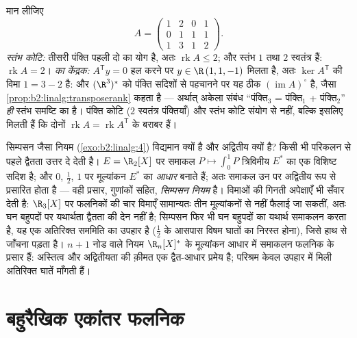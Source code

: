 \begin{example}[कोटि दोनों ओर से पढ़ी गई]\label{ex:b2:linalg:rankbothsides}
मान लीजिए
\[
A = \begin{pmatrix}
1 & 2 & 0 & 1\\
0 & 1 & 1 & 1\\
1 & 3 & 1 & 2
\end{pmatrix} .
\]
\emph{स्तंभ कोटि:} तीसरी पंक्ति पहली दो का योग है, अतः $\operatorname{rk} A \leq 2$; और स्तंभ
$1$ तथा $2$ स्वतंत्र हैं: $\operatorname{rk} A = 2$। \emph{ का केंद्रक:} $A^{\mathsf T}y = 0$ हल करने
पर $y \in \R\,(1, 1, -1)$ मिलता है, अतः $\ker
A^{\mathsf T}$ की विमा $1 = 3 - 2$ है: और $(\R^3)^*$ को पंक्ति सदिशों से
पहचानने पर यह ठीक $(\operatorname{im} A)^\circ$ है, जैसा \cref{prop:b2:linalg:transposerank} कहता है --- अर्थात् अकेला संबंध
``पंक्ति$_3$ = पंक्ति$_1$ + पंक्ति$_2$'' \emph{ही} स्तंभ समष्टि का
 है। पंक्ति कोटि ($2$ स्वतंत्र पंक्तियाँ) और स्तंभ कोटि संयोग
से नहीं, बल्कि इसलिए मिलती हैं कि दोनों $\operatorname{rk} A = \operatorname{rk} A^{\mathsf T}$ के बराबर हैं।
\end{example}

\begin{example}[द्वैतता एक समाकलन नियम पढ़ती है]\label{ex:b2:linalg:quadratureread}
सिम्पसन जैसा नियम (\cref{exo:b2:linalg:4}) विद्यमान क्यों है और अद्वितीय क्यों है? किसी
भी परिकलन से पहले द्वैतता उत्तर दे देती है। $E = \R_2[X]$ पर समाकल $P \mapsto \int_0^1 P$
त्रिविमीय  $E^*$ का एक विशिष्ट सदिश है; और $0$, $\frac12$, $1$ पर
मूल्यांकन $E^*$ का \emph{आधार} बनाते हैं; अतः समाकल उन पर अद्वितीय रूप
से प्रसारित होता है --- वही प्रसार, गुणांकों सहित, \emph{सिम्पसन नियम}
है। विमाओं की गिनती अपेक्षाएँ भी सँवार देती है: $\R_3[X]$ पर फलनिकों की चार
विमाएँ सामान्यतः तीन मूल्यांकनों से नहीं फैलाई जा सकतीं, अतः घन
बहुपदों पर यथार्थता द्वैतता की देन नहीं है; सिम्पसन फिर भी घन बहुपदों
का यथार्थ समाकलन करता है, यह एक अतिरिक्त सममिति का उपहार है ($\frac12$ के
आसपास विषम घातों का निरस्त होना), जिसे हाथ से जाँचना पड़ता है। $n + 1$
नोड वाले नियम $\R_n[X]^*$ के मूल्यांकन आधार में समाकलन फलनिक के प्रसार हैं:
अस्तित्व और अद्वितीयता की क़ीमत एक द्वैत-आधार प्रमेय है; परिश्रम केवल
उपहार में मिली अतिरिक्त घातें माँगती हैं।
\end{example}

\section{बहुरैखिक एकांतर फलनिक}


